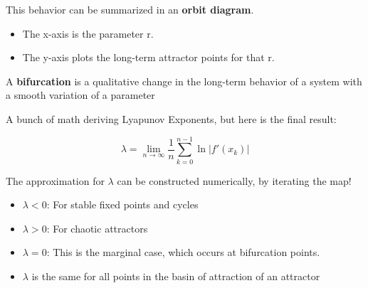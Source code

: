 This behavior can be summarized in an \textbf{orbit diagram}.
\begin{itemize}
    \item The x-axis is the parameter r.
    \item The y-axis plots the long-term attractor points for that r.
\end{itemize}    

A \textbf{bifurcation} is a qualitative change in the long-term behavior
of a system with a smooth variation of a parameter
    
A bunch of math deriving Lyapunov Exponents, but here is the final result:

\[\lambda = \lim_{n \to \infty} \frac{1}{n} \sum_{k=0}^{n-1} \ln|f'(x_k)|\]

The approximation for $\lambda$ can be constructed numerically, by iterating the map!
\begin{itemize}
    \item $\lambda < 0$: For stable fixed points and cycles
    \item $\lambda > 0$: For chaotic attractors
    \item $\lambda = 0$: This is the marginal case, which occurs at bifurcation points.
    \item $\lambda$ is the same for all points in the basin of attraction of an attractor
\end{itemize} 
    

